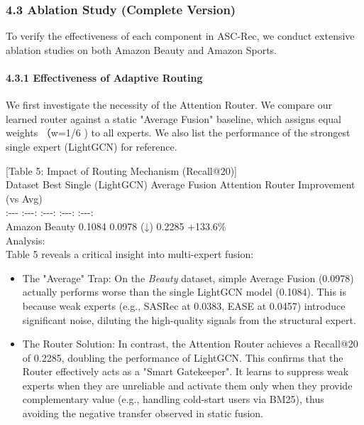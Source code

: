 \documentclass[]{article}
\let\oldparagraph\paragraph
\renewcommand{\paragraph}[1]{\oldparagraph{#1}\mbox{}}
\begin{document}
\hypertarget{ablation-study-complete-version}{%
\subsubsection{4.3 Ablation Study (Complete
Version)}\label{ablation-study-complete-version}}

To verify the effectiveness of each component in ASC-Rec, we conduct
extensive ablation studies on both Amazon Beauty and Amazon Sports.

\hypertarget{effectiveness-of-adaptive-routing}{%
\paragraph{4.3.1 Effectiveness of Adaptive
Routing}\label{effectiveness-of-adaptive-routing}}

We first investigate the necessity of the Attention Router. We compare
our learned router against a static "Average Fusion" baseline, which
assigns equal weights （w=1/6 ) to all experts. We also list the
performance of the strongest single expert (LightGCN) for reference.

{[}Table 5: Impact of Routing Mechanism (Recall@20){]}\\
\textbar{} Dataset \textbar{} Best Single (LightGCN) \textbar{} Average
Fusion \textbar{} Attention Router \textbar{} Improvement (vs Avg)
\textbar{}\\
\textbar{} :-\/-\/- \textbar{} :-\/-\/-: \textbar{} :-\/-\/-: \textbar{}
:-\/-\/-: \textbar{} :-\/-\/-: \textbar{}\\
\textbar{} Amazon Beauty \textbar{} 0.1084 \textbar{} 0.0978 (↓)
\textbar{} 0.2285 \textbar{} +133.6\% \textbar{}\\
Analysis:\\
Table 5 reveals a critical insight into multi-expert fusion:

\begin{itemize}
\item
  The "Average" Trap: On the \emph{Beauty} dataset, simple Average
  Fusion (0.0978) actually performs worse than the single LightGCN model
  (0.1084). This is because weak experts (e.g., SASRec at 0.0383, EASE
  at 0.0457) introduce significant noise, diluting the high-quality
  signals from the structural expert.
\item
  The Router Solution: In contrast, the Attention Router achieves a
  Recall@20 of 0.2285, doubling the performance of LightGCN. This
  confirms that the Router effectively acts as a "Smart Gatekeeper". It
  learns to suppress weak experts when they are unreliable and activate
  them only when they provide complementary value (e.g., handling
  cold-start users via BM25), thus avoiding the negative transfer
  observed in static fusion.
\end{itemize}
\end{document}
